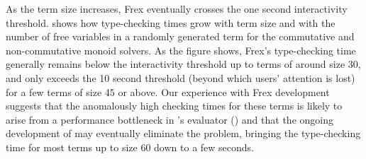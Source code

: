 As the term size increases, Frex eventually crosses the one second
interactivity threshold.   shows how type-checking
times grow with term size and with the number of free variables in a
randomly generated term for the commutative and non-commutative monoid
solvers.
%
As the figure shows, Frex's type-checking time generally remains below
the interactivity threshold up to terms of around size 30, and only
exceeds the 10 second threshold (beyond which users' attention is
lost) for a few terms of size 45 or above.
%
Our experience with Frex development suggests that the anomalously
high checking times for these terms is likely to arise from a
performance bottleneck in \idris{}'s evaluator ()
and that the ongoing development of \idris{} may eventually eliminate
the problem, bringing the type-checking time for most terms up to size
60 down to a few seconds.
%
